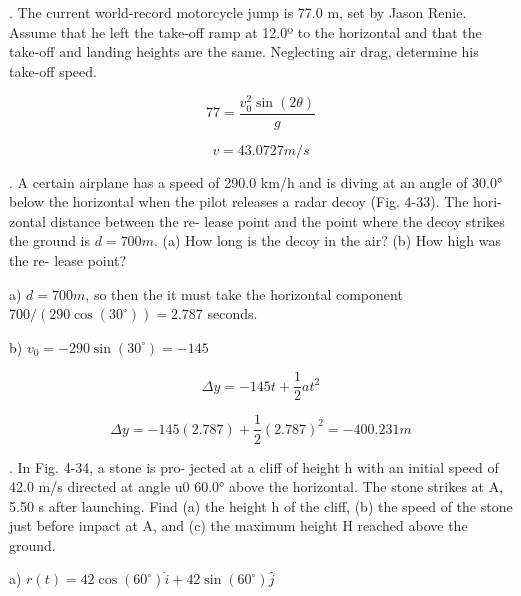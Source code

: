 \documentclass{scrreprt} %
\begin{document}
. The current world-record motorcycle jump is 77.0 m,
set  by  Jason  Renie. Assume  that he  left  the  take-off  ramp  at  
12.0º to the horizontal and that the take-off and landing 
heights are the same. Neglecting air drag, determine his take-off
speed.

$$77=\frac{v_0^2\sin(2\theta)}{g}$$

$$\boxed{v = 43.0727 m/s}$$

. A certain airplane has a
speed  of  290.0 km/h  and  is  diving
at  an  angle  of 30.0° below  the
horizontal  when  the pilot  releases
a radar decoy (Fig. 4-33). The hori-
zontal distance between the re-
lease  point  and  the  point  where
the decoy strikes the ground is $d =
700 m$. (a) How long is the decoy in
the  air?  (b)  How  high  was  the  re-
lease point?

a) $d = 700m$, so then the it must take the horizontal component
$700/(290\cos(30^\circ))=\boxed{2.787}$ seconds.

b) $v_0 = -290\sin(30^\circ) = -145$

$$\Delta y = -145t + \frac{1}{2}at^2$$

$$\Delta y = -145(2.787) + \frac{1}{2}(2.787)^2 = \boxed{-400.231 m}$$

. In Fig. 4-34, a stone is pro-
jected at a cliff of height h with an initial speed of 42.0 m/s directed
at  angle  u0 60.0° above  the  horizontal. The  stone  strikes  at  A,
5.50 s  after  launching. Find  (a)  the  height  h of  the  cliff, (b)  the
speed of the stone just before impact at A, and (c) the maximum
height H reached above the ground.

a) $r(t) = 42\cos(60^\circ)\hat{i} + 42\sin(60^\circ)\hat{j}$
\end{document}
